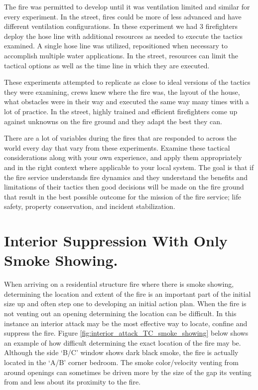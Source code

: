 \documentclass[12pt,oneside]{book}
\begin{document}
The fire was permitted to develop until it was ventilation limited and similar for every experiment. In the street, fires could be more of less advanced and have different ventilation configurations. In these experiment we had 3 firefighters deploy the hose line with additional resources as needed to execute the tactics examined. A single hose line was utilized, repositioned when necessary to accomplish multiple water applications. In the street, resources can limit the tactical options as well as the time line in which they are executed.  

These experiments attempted to replicate as close to ideal versions of the tactics they were examining, crews knew where the fire was, the layout of the house, what obstacles were in their way and executed the same way many times with a lot of practice. In the street, highly trained and efficient firefighters come up against unknowns on the fire ground and they adapt the best they can.

There are a lot of variables during the fires that are responded to across the world every day that vary from these experiments.  Examine these tactical considerations along with your own experience, and apply them appropriately and in the right context where applicable to your local system. The goal is that if the fire service understands fire dynamics and they understand the benefits and limitations of their tactics then good decisions will be made on the fire ground that result in the best possible outcome for the mission of the fire service; life safety, property conservation, and incident stabilization.  

\section{Interior Suppression With Only Smoke Showing.} \label{tc:interior_attack_smoke_showing}

When arriving on a residential structure fire where there is smoke showing, determining the location and extent of the fire is an important part of the initial size up and often step one to developing an initial action plan. When the fire is not venting out an opening determining the location can be difficult. In this instance an interior attack may be the most effective way to locate, confine and suppress the fire. Figure \ref{fig:interior_attack_TC_smoke_showing} below shows an example of how difficult determining the exact location of the fire may be. Although the side `B/C' window shows dark black smoke, the fire is actually located in the `A/B' corner bedroom. The smoke color/velocity venting from around openings can sometimes be driven more by the size of the gap its venting from and less about its proximity to the fire. 
\end{document}
